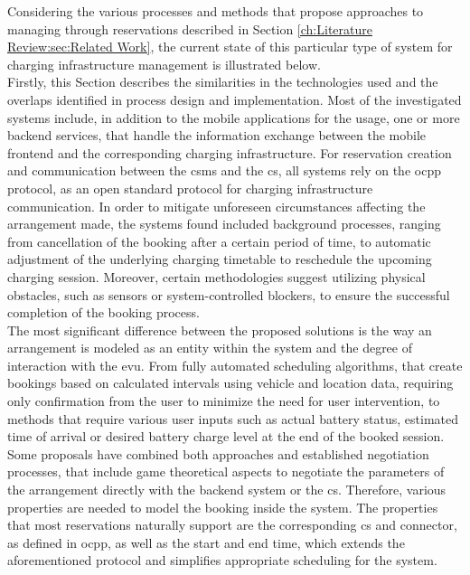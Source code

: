Considering the various processes and methods that propose approaches to managing  through reservations described in Section \ref{ch:Literature Review:sec:Related Work}, the current state of this particular type of system for charging infrastructure management is illustrated below. \\
\noindent Firstly, this Section describes the similarities in the technologies used and the overlaps identified in process design and implementation.
Most of the investigated systems include, in addition to the mobile applications for the  usage, one or more backend services, that handle the information exchange between the mobile frontend and the corresponding charging infrastructure.
For reservation creation and communication between the \acrshort{csms} and the \acrshort{cs}, all systems rely on the \acrshort{ocpp} protocol, as an open standard protocol for charging infrastructure communication.
In order to mitigate unforeseen circumstances affecting the arrangement made, the systems found included background processes, ranging from cancellation of the booking after a certain period of time, to automatic adjustment of the underlying charging timetable to reschedule the upcoming charging session.
Moreover, certain methodologies suggest utilizing physical obstacles, such as sensors or system-controlled blockers, to ensure the successful completion of the booking process. \\
\noindent The most significant difference between the proposed solutions is the way an arrangement is modeled as an entity within the system and the degree of interaction with the \acrshort{evu}.
From fully automated scheduling algorithms, that create bookings based on calculated intervals using vehicle and location data, requiring only confirmation from the user to minimize the need for user intervention, to methods that require various user inputs such as actual battery status, estimated time of arrival or desired battery charge level at the end of the booked session.
Some proposals have combined both approaches and established negotiation processes, that include game theoretical aspects to negotiate the parameters of the arrangement directly with the backend system or the \acrshort{cs}.
Therefore, various properties are needed to model the booking inside the system. The properties that most reservations naturally support are the corresponding \acrshort{cs} and connector, as defined in \acrshort{ocpp}, as well as the start and end time, which extends the aforementioned protocol and simplifies appropriate scheduling for the system. \\
